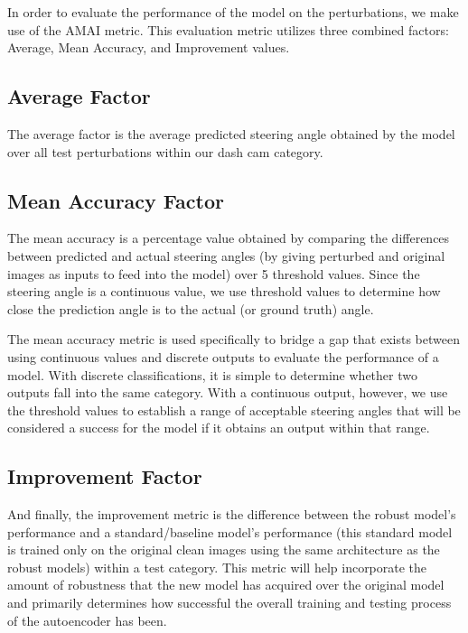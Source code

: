 \documentclass{article}
\begin{document}
In order to evaluate the performance of the model on the perturbations, we make use of the AMAI metric. This evaluation metric utilizes three combined factors: Average, Mean Accuracy, and Improvement values.

\subsection{Average Factor}

The average factor is the average predicted steering angle obtained by the model over all test perturbations within our dash cam category.

\subsection{Mean Accuracy Factor}

The mean accuracy is a percentage value obtained by comparing the differences between predicted and actual steering angles (by giving perturbed and original images as inputs to feed into the model) over 5 threshold values. Since the steering angle is a continuous value, we use threshold values to determine how close the prediction angle is to the actual (or ground truth) angle.

The mean accuracy metric is used specifically to bridge a gap that exists between using continuous values and discrete outputs to evaluate the performance of a model. With discrete classifications, it is simple to determine whether two outputs fall into the same category. With a continuous output, however, we use the threshold values to establish a range of acceptable steering angles that will be considered a success for the model if it obtains an output within that range.

\subsection{Improvement Factor}

And finally, the improvement metric is the difference between the robust model's performance and a standard/baseline model's performance (this standard model is trained only on the original clean images using the same architecture as the robust models) within a test category. This metric will help incorporate the amount of robustness that the new model has acquired over the original model and primarily determines how successful the overall training and testing process of the autoencoder has been.
\end{document}
